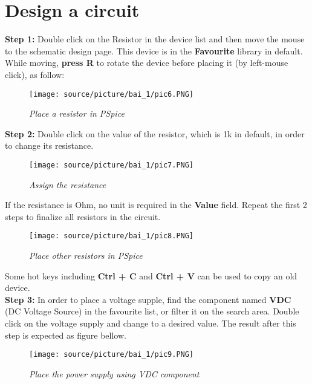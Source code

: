 \section{Design a circuit}

\textbf{Step 1: } Double click on the Resistor in the device list and then move the mouse to the schematic design page. This device is in the \textbf{Favourite} library in default. While moving, \textbf{press R} to rotate the device before placing it (by left-mouse click), as follow:

\begin{figure}[!htp]
    \centering
    \texttt{[image: source/picture/bai\_1/pic6.PNG]}
    \caption{\textit{Place a resistor in PSpice}}
    \label{bai1_pic6}
\end{figure}

\newpage
\textbf{Step 2: } Double click on the value of the resistor, which is 1k in default, in order to change its resistance.

\begin{figure}[!htp]
    \centering
    \texttt{[image: source/picture/bai\_1/pic7.PNG]}
    \caption{\textit{Assign the resistance}}
    \label{bai1_pic7}
\end{figure}

If the resistance is Ohm, no unit is required in the \textbf{Value} field. Repeat the first 2 steps to finalize all resistors in the circuit.

\begin{figure}[!htp]
    \centering
    \texttt{[image: source/picture/bai\_1/pic8.PNG]}
    \caption{\textit{Place other resistors in PSpice}}
    \label{bai1_pic8}
\end{figure}

Some hot keys including \textbf{Ctrl + C} and \textbf{Ctrl + V} can be used to copy an old device.\\

\textbf{Step 3: } In order to place a voltage supple, find the component named \textbf{VDC} (DC Voltage Source) in the favourite list, or filter it on the search area. Double click on the voltage supply and change to a desired value. The result after this step is expected as figure bellow.

\begin{figure}[!htp]
    \centering
    \texttt{[image: source/picture/bai\_1/pic9.PNG]}
    \caption{\textit{Place the power supply using VDC component}}
    \label{bai1_pic9}
\end{figure}

